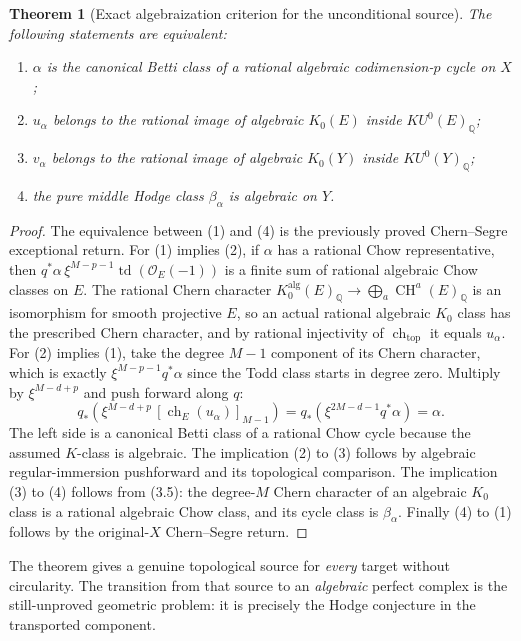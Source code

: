 \documentclass[11pt]{article}
\newcommand{\Q}{\mathbb Q}
\newcommand{\CH}{\operatorname{CH}}
\newcommand{\td}{\operatorname{td}}
\newcommand{\ch}{\operatorname{ch}}
\newtheorem{theorem}{Theorem}[section]
\begin{document}
\begin{theorem}[Exact algebraization criterion for the unconditional source]
The following statements are equivalent:
\begin{enumerate}
 \item \(\alpha\) is the canonical Betti class
       of a rational algebraic codimension-\(p\)
       cycle on \(X\);
 \item \(u_\alpha\) belongs to the rational
       image of algebraic \(K_0(E)\) inside
       \(KU^0(E)_{\Q}\);
 \item \(v_\alpha\) belongs to the rational
       image of algebraic \(K_0(Y)\) inside
       \(KU^0(Y)_{\Q}\);
 \item the pure middle Hodge class
       \(\beta_\alpha\) is algebraic on \(Y\).
\end{enumerate}
\end{theorem}
\begin{proof}
The equivalence between (1) and (4) is
the previously proved Chern--Segre
exceptional return.
For (1) implies (2), if \(\alpha\)
has a rational Chow representative,
then \(q^*\alpha\,\xi^{M-p-1}
\td(\mathcal O_E(-1))\) is a finite sum
of rational algebraic Chow classes on \(E\).
The rational Chern character
\(K_0^{\mathrm{alg}}(E)_{\Q}
 \to\bigoplus_a\CH^a(E)_{\Q}\)
is an isomorphism for smooth projective
\(E\), so an actual rational algebraic
\(K_0\) class has the prescribed Chern
character, and by rational injectivity
of \(\ch_{\mathrm{top}}\) it equals \(u_\alpha\).
For (2) implies (1), take
the degree \(M-1\) component of its
Chern character, which is exactly
\(\xi^{M-p-1}q^*\alpha\) since
the Todd class starts in degree zero.
Multiply by \(\xi^{M-d+p}\) and push
forward along \(q\):
\[
 q_*\left(
  \xi^{M-d+p}\,
  [\ch_E(u_\alpha)]_{M-1}
  \right)
  =q_*(\xi^{2M-d-1}q^*\alpha)
  =\alpha.
 \tag{4.1}
\]
The left side is a canonical Betti class
of a rational Chow cycle because the
assumed \(K\)-class is algebraic.
The implication (2) to (3) follows
by algebraic regular-immersion pushforward
and its topological comparison.
The implication (3) to (4) follows
from (3.5): the degree-\(M\)
Chern character of an algebraic
\(K_0\) class is a rational algebraic
Chow class, and its cycle class is
\(\beta_\alpha\).
Finally (4) to (1) follows by
the original-\(X\) Chern--Segre return.
\end{proof}
The theorem gives a genuine topological
source for \emph{every} target without
circularity. The transition from that
source to an \emph{algebraic} perfect
complex is the still-unproved geometric
problem: it is precisely the Hodge
conjecture in the transported component.
\end{document}
